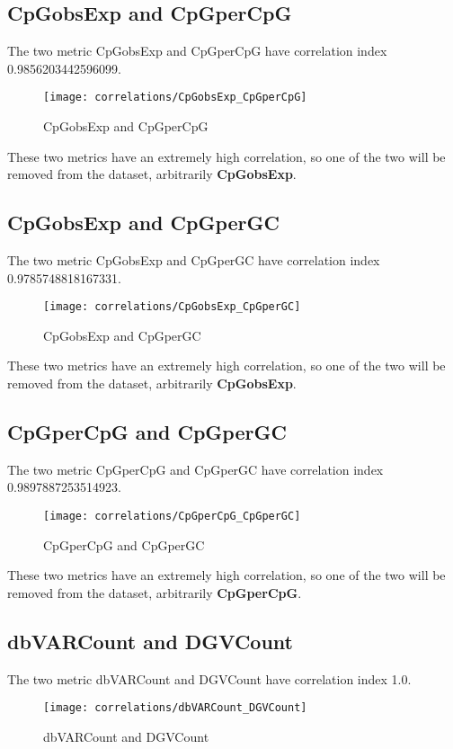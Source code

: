 \documentclass[\main/main.tex]{subfiles}
\begin{document}
\subsection{CpGobsExp and CpGperCpG}
The two metric CpGobsExp and CpGperCpG have correlation index 0.9856203442596099.

\begin{figure}
  \texttt{[image: correlations/CpGobsExp\_CpGperCpG]}
  \caption{CpGobsExp and CpGperCpG}
\end{figure}

These two metrics have an extremely high correlation, so one of the two will be removed from the dataset, arbitrarily \textbf{CpGobsExp}.

\subsection{CpGobsExp and CpGperGC}
The two metric CpGobsExp and CpGperGC have correlation index 0.9785748818167331.

\begin{figure}
  \texttt{[image: correlations/CpGobsExp\_CpGperGC]}
  \caption{CpGobsExp and CpGperGC}
\end{figure}

These two metrics have an extremely high correlation, so one of the two will be removed from the dataset, arbitrarily \textbf{CpGobsExp}.

\subsection{CpGperCpG and CpGperGC}
The two metric CpGperCpG and CpGperGC have correlation index 0.9897887253514923.

\begin{figure}
  \texttt{[image: correlations/CpGperCpG\_CpGperGC]}
  \caption{CpGperCpG and CpGperGC}
\end{figure}

These two metrics have an extremely high correlation, so one of the two will be removed from the dataset, arbitrarily \textbf{CpGperCpG}.

\subsection{dbVARCount and DGVCount}
The two metric dbVARCount and DGVCount have correlation index 1.0.

\begin{figure}
  \texttt{[image: correlations/dbVARCount\_DGVCount]}
  \caption{dbVARCount and DGVCount}
\end{figure}
\end{document}
